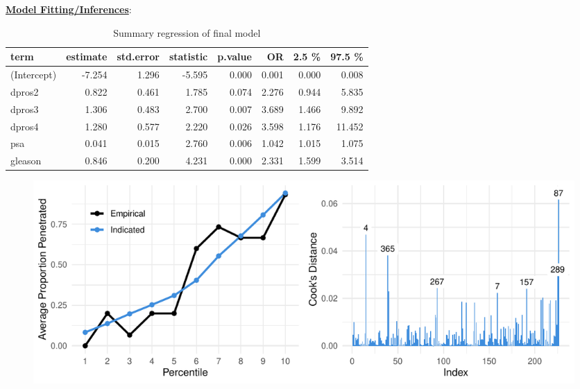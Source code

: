 \documentclass[11pt]{article}\usepackage[]{graphicx}\usepackage[]{color}
\makeatletter
\def\maxwidth{ %
  \ifdim\Gin@nat@width>\linewidth
    \linewidth
  \else
    \Gin@nat@width
  \fi
}
\makeatother
\begin{document}
\noindent\textbf{\underline{Model Fitting/Inferences}}: 
\hfill \break







\begin{center}
\begin{table}[ht]
\centering
\begin{tabular}{lrrrrrrr}
  \hline
term & estimate & std.error & statistic & p.value & OR & 2.5 \% & 97.5 \% \\ 
  \hline
(Intercept) & -7.254 & 1.296 & -5.595 & 0.000 & 0.001 & 0.000 & 0.008 \\ 
  dpros2 & 0.822 & 0.461 & 1.785 & 0.074 & 2.276 & 0.944 & 5.835 \\ 
  dpros3 & 1.306 & 0.483 & 2.700 & 0.007 & 3.689 & 1.466 & 9.892 \\ 
  dpros4 & 1.280 & 0.577 & 2.220 & 0.026 & 3.598 & 1.176 & 11.452 \\ 
  psa & 0.041 & 0.015 & 2.760 & 0.006 & 1.042 & 1.015 & 1.075 \\ 
  gleason & 0.846 & 0.200 & 4.231 & 0.000 & 2.331 & 1.599 & 3.514 \\ 
   \hline
\end{tabular}
\caption{Summary regression of final model} 
\label{reg_summary_final}
\end{table}

\end{center}


\begin{figure}[h!] 
\begin{center}

\includegraphics[width=\maxwidth]{figure/unnamed-chunk-4-1} 

\caption{}
\label{model_plot_1}
\end{center} 
\end{figure}
\end{document}
